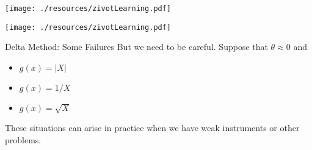 \begin{frame}[plain]{}
	\texttt{[image: ./resources/zivotLearning.pdf]}
\end{frame}

\begin{frame}[plain]{}
	\texttt{[image: ./resources/zivotLearning.pdf]}
\end{frame}

\begin{frame}{Delta Method: Some Failures}
  But we need to be careful.  Suppose that $\theta \approx 0$ and 
  \begin{itemize}
  \item $g(x)  = |X|$
  \item $g(x)  = 1/X$
  \item $g(x)  = \sqrt{X}$
  \end{itemize}
  These situations can arise in practice when we have weak instruments or other problems.\end{frame}
  
